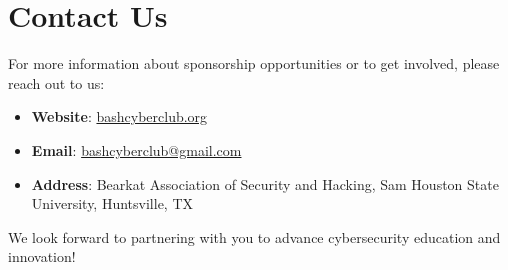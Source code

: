 \documentclass[11pt,letterpaper]{article}
\begin{document}
\section*{Contact Us}
For more information about sponsorship opportunities or to get involved, please reach out to us:

\begin{itemize}
    \item \textbf{Website}: \url{bashcyberclub.org}
    \item \textbf{Email}: \href{mailto:bashcyberclub@gmail.com}{bashcyberclub@gmail.com}
    \item \textbf{Address}: Bearkat Association of Security and Hacking, Sam Houston State University, Huntsville, TX
\end{itemize}

We look forward to partnering with you to advance cybersecurity education and innovation!
\end{document}
